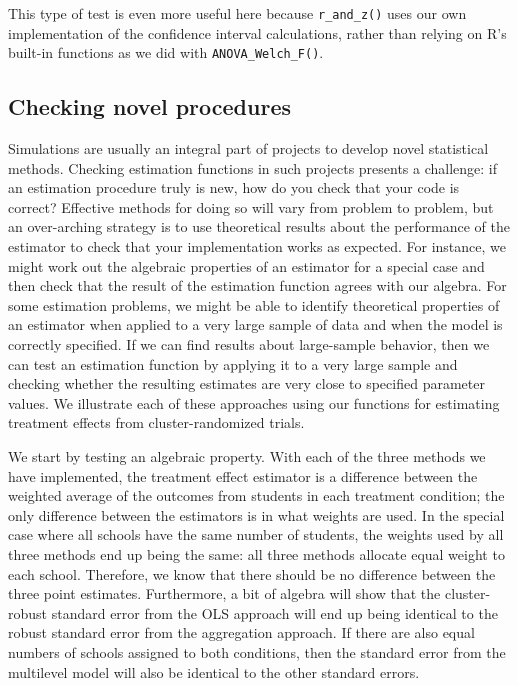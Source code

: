 \documentclass[
]{book}
\begin{document}
This type of test is even more useful here because \texttt{r\_and\_z()} uses our own implementation of the confidence interval calculations, rather than relying on R's built-in functions as we did with \texttt{ANOVA\_Welch\_F()}.

\subsection{Checking novel procedures}\label{checking-novel-procedures}

Simulations are usually an integral part of projects to develop novel statistical methods.
Checking estimation functions in such projects presents a challenge: if an estimation procedure truly is new, how do you check that your code is correct?
Effective methods for doing so will vary from problem to problem, but an over-arching strategy is to use theoretical results about the performance of the estimator to check that your implementation works as expected.
For instance, we might work out the algebraic properties of an estimator for a special case and then check that the result of the estimation function agrees with our algebra.
For some estimation problems, we might be able to identify theoretical properties of an estimator when applied to a very large sample of data and when the model is correctly specified.
If we can find results about large-sample behavior, then we can test an estimation function by applying it to a very large sample and checking whether the resulting estimates are very close to specified parameter values.
We illustrate each of these approaches using our functions for estimating treatment effects from cluster-randomized trials.

We start by testing an algebraic property.
With each of the three methods we have implemented, the treatment effect estimator is a difference between the weighted average of the outcomes from students in each treatment condition;
the only difference between the estimators is in what weights are used.
In the special case where all schools have the same number of students, the weights used by all three methods end up being the same: all three methods allocate equal weight to each school.
Therefore, we know that there should be no difference between the three point estimates.
Furthermore, a bit of algebra will show that the cluster-robust standard error from the OLS approach will end up being identical to the robust standard error from the aggregation approach.
If there are also equal numbers of schools assigned to both conditions, then the standard error from the multilevel model will also be identical to the other standard errors.
\end{document}
